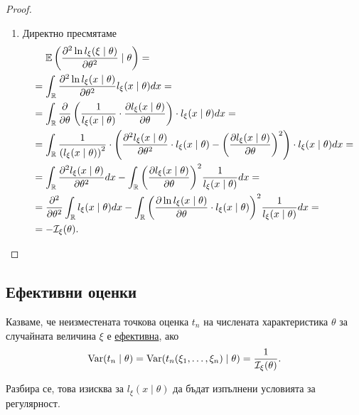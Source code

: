 \documentclass[numbers=endperiod, DIV=15, bibliography=totocnumbered]{scrartcl}
\begin{document}
\begin{proof}
\begin{enumerate}
    \item Директно пресмятаме
    \begin{align*}
      &~~~~\mathbb{E}\left( \frac {\partial^2 \ln l_\xi(\xi \mid \theta)} {\partial \theta^2} \mid \theta \right)
      = \\ &=
      \int_{\mathbb{R}} \frac {\partial^2 \ln l_\xi(x \mid \theta)} {\partial \theta^2} l_\xi(x \mid \theta) dx
      = \\ &=
      \int_{\mathbb{R}} \frac \partial {\partial \theta} \left(\frac 1 {l_\xi(x \mid \theta)} \cdot \frac {\partial l_\xi(x \mid \theta)} {\partial \theta} \right) \cdot l_\xi(x \mid \theta) dx
      = \\ &=
      \int_{\mathbb{R}} \frac 1 {{(l_\xi(x \mid \theta))}^2} \cdot \left( \frac {\partial^2 l_\xi(x \mid \theta)} {\partial \theta^2} \cdot l_\xi(x \mid \theta) - {\left(\frac {\partial l_\xi(x \mid \theta)} {\partial \theta} \right)}^2 \right) \cdot l_\xi(x \mid \theta) dx
      = \\ &=
      \int_{\mathbb{R}} \frac {\partial^2 l_\xi(x \mid \theta)} {\partial \theta^2} dx - \int_{\mathbb{R}} {\left(\frac {\partial l_\xi(x \mid \theta)} {\partial \theta} \right)}^2 \frac 1 {l_\xi(x \mid \theta)} dx
      = \\ &=
      \frac {\partial^2} {\partial \theta^2} \int_{\mathbb{R}} l_\xi(x \mid \theta) dx - \int_{\mathbb{R}} {\left(\frac {\partial \ln l_\xi(x \mid \theta)} {\partial \theta} \cdot l_\xi(x \mid \theta) \right)}^2 \frac 1 {l_\xi(x \mid \theta)} dx
      = \\ &=
      -\mathcal{I}_\xi(\theta).
    \end{align*}
  \end{enumerate}
\end{proof}

\subsection{Ефективни оценки}

\begin{definition}
  Казваме, че неизместената точкова оценка $t_n$ на числената характеристика $\theta$ за случайната величина $\xi$ е \uline{ефективна}, ако
  \begin{displaymath}
    \operatorname{Var}(t_n \mid \theta) = \operatorname{Var}(t_n(\xi_1, \ldots, \xi_n) \mid \theta) = \frac 1 {\mathcal{I}_\xi(\theta)}.
  \end{displaymath}

  Разбира се, това изисква за $l_\xi(x \mid \theta)$ да бъдат изпълнени условията за регулярност.
\end{definition}
\end{document}
